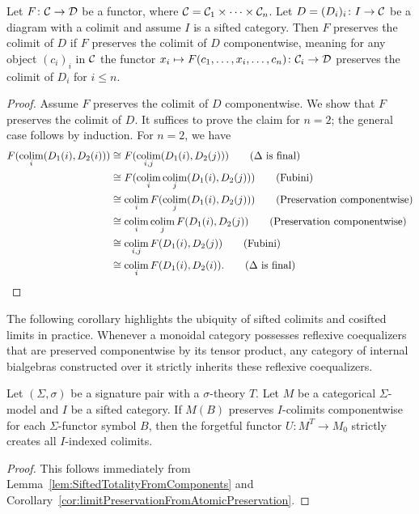 \begin{lemma}\label{lem:SiftedTotalityFromComponents}
   Let $F\colon \mathcal{C} \to \mathcal{D}$ be a functor, where $\mathcal{C} = \mathcal{C}_1\times\cdots \times \mathcal{C}_n$. Let $D = (D_i)_i\colon I\to \mathcal{C}$ be a diagram with a colimit and assume $I$ is a sifted category. Then $F$ preserves the colimit of $D$ if $F$ preserves the colimit of $D$ componentwise, meaning for any object $(c_i)_i$ in $\mathcal{C}$ the functor $x_i\mapsto F(c_1,\ldots,x_i,\ldots, c_n)\colon \mathcal{C}_i\to \mathcal{D}$ preserves the colimit of $D_i$ for $i\leq n$.
\end{lemma}
\begin{proof}
   Assume $F$ preserves the colimit of $D$ componentwise. We show that $F$ preserves the colimit of $D$. It suffices to prove the claim for $n = 2$; the general case follows by induction. For $n = 2$, we have
   \begin{align*}
       F(\operatorname*{colim}_i (D_1(i), D_2(i)))
       &\cong F(\operatorname*{colim}_{i,j}(D_1(i),D_2(j)))\tag{$\Delta$ is final}\\
       &\cong F(\operatorname*{colim}_i \operatorname*{colim}_j(D_1(i),D_2(j)))\tag{Fubini}\\
       &\cong \operatorname*{colim}_i F(\operatorname*{colim}_j(D_1(i),D_2(j)))\tag{Preservation componentwise}\\
       &\cong \operatorname*{colim}_i\operatorname*{colim}_j F(D_1(i),D_2(j))\tag{Preservation componentwise}\\
       &\cong \operatorname*{colim}_{i,j} F(D_1(i),D_2(j))\tag{Fubini}\\
       &\cong \operatorname*{colim}_i F(D_1(i),D_2(i)).\tag{$\Delta$ is final}
   \end{align*}
\end{proof}

The following corollary highlights the ubiquity of sifted colimits and cosifted limits in practice. Whenever a monoidal category possesses reflexive coequalizers that are preserved componentwise by its tensor product, any category of internal bialgebras constructed over it strictly inherits these reflexive coequalizers.

\begin{corollary}\label{cor:liftingSifted}
   Let $(\Sigma, \sigma)$ be a signature pair with a $\sigma$-theory $T$. Let $M$ be a categorical $\Sigma$-model and $I$ be a sifted category. If $M(B)$ preserves $I$-colimits componentwise for each $\Sigma$-functor symbol $B$, then the forgetful functor $U\colon M^T\to M_0$ strictly creates all $I$-indexed colimits.
\end{corollary}
\begin{proof}
   This follows immediately from Lemma~\ref{lem:SiftedTotalityFromComponents} and Corollary~\ref{cor:limitPreservationFromAtomicPreservation}.
\end{proof}

